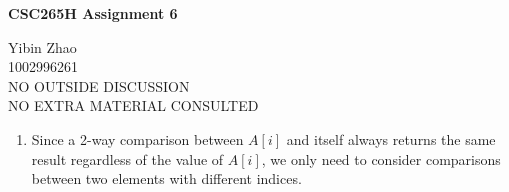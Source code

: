 \documentclass[10pt]{article}
\newtheorem{lemma}[theorem]{Lemma}
\begin{document}
\begin{center}
{\bf \Large \bf CSC265H Assignment 6}
\end{center}

\noindent
Yibin Zhao\\
1002996261\\
NO OUTSIDE DISCUSSION\\
NO EXTRA MATERIAL CONSULTED\\

\begin{comment}
The median of a set of numbers is the element with rank $\lfloor (n+1)/2 \rfloor$.
\end{comment}

\begin{enumerate}
	
	\begin{comment}
	Prove that any decesion tree using 2-way comparisons that finds the median of $n$ distinct numbers 
	also determines the set of numbers greater than the median and the set of numbers smaller than the median.
	\end{comment}

	\item
	Since a 2-way comparison between $A[i]$ and itself always returns the same
	result regardless of the value of $A[i]$, we only need to consider
	comparisons between two elements with different indices. 

	\begin{comment}
	\begin{lemma}
	For any input of size $n$, any number is compared by at least once in its path
	of a decision tree that solve this problem.
	\end{lemma}

	\begin{proof}
	Consider an array $A$ of size $n$. 
	Suppose there exists such an element $A[j]$ not being compared by any other elements.
	Let $A[k]$ be the number with rank $\lfloor (n+1)/2 \rfloor$.
	Then, the decision tree gives an output of $A[k]$ for this input $A$. 

	Let $B[i] = A[i]$ for all $i \neq j$. \\
	If $A[j] > A[k]$, then set $B[j] = A[k]-1$. 
	Otherwise, set $B[j] = A[k]+1$. \\
	This guarantee that the median of $B$ is not $B[k]$.
	
	Consider any comparison in the path of the decision tree for input $A$.
	Denote the two numbers being compared as $A[p]$ and $A[q]$, where $p \neq q$. \\
	By the assumption, neither $p, q$ could be $j$. 
 	Then the same comparison between $B[p]$ and $B[q]$ should have the same result. \\
	Thus, the output is consistent for $A$ and $B$.
	

\end{comment}
\end{enumerate}
\end{document}
